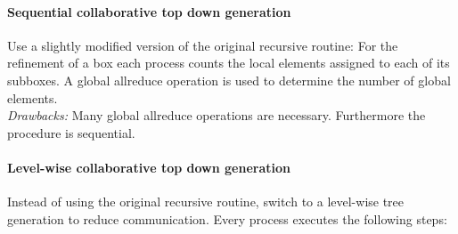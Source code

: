 \documentclass[a4paper,11pt]{article}
\theoremstyle{plain}
\theoremstyle{definition}
\theoremstyle{remark}
\begin{document}
\paragraph{Sequential collaborative top down generation}
Use a slightly modified version of the original recursive routine: For the refinement of a box each process counts the local elements assigned to each of its subboxes. A global allreduce operation is used to determine the number of global elements. \\
\textit{Drawbacks:} Many global allreduce operations are necessary. Furthermore the procedure is sequential.

\paragraph{Level-wise collaborative top down generation}
Instead of using the original recursive routine, switch to a level-wise tree generation to reduce communication. Every process executes the following steps: 
\end{document}
